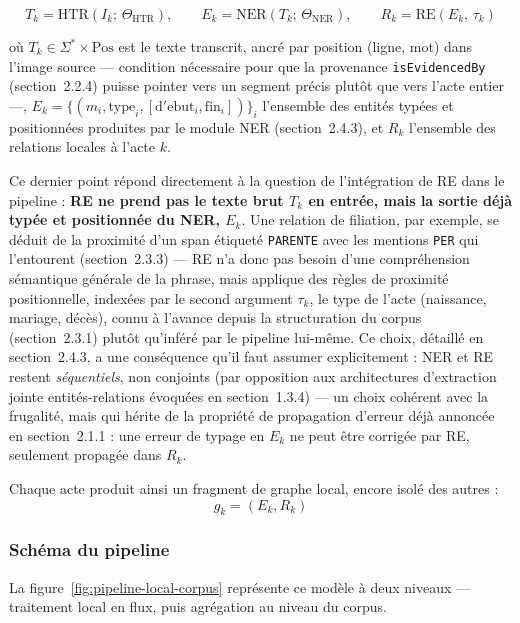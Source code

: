 \begin{equation}
    T_k = \mathrm{HTR}(I_k;\, \Theta_{\mathrm{HTR}}), \qquad
    E_k = \mathrm{NER}(T_k;\, \Theta_{\mathrm{NER}}), \qquad
    R_k = \mathrm{RE}(E_k,\, \tau_k)
\end{equation}

où $T_k \in \Sigma^{*} \times \mathrm{Pos}$ est le texte transcrit, ancré par position (ligne, mot) dans l'image source --- condition nécessaire pour que la provenance \texttt{isEvidencedBy} (section~2.2.4) puisse pointer vers un segment précis plutôt que vers l'acte entier ---, $E_k = \{(m_i, \mathrm{type}_i, [\mathrm{d'ebut}_i,\mathrm{fin}_i])\}_i$ l'ensemble des entités typées et positionnées produites par le module NER (section~2.4.3), et $R_k$ l'ensemble des relations locales à l'acte $k$.

Ce dernier point répond directement à la question de l'intégration de RE dans le pipeline : \textbf{RE ne prend pas le texte brut $T_k$ en entrée, mais la sortie déjà typée et positionnée du NER, $E_k$}.
Une relation de filiation, par exemple, se déduit de la proximité d'un span étiqueté \texttt{PARENTE} avec les mentions \texttt{PER} qui l'entourent (section~2.3.3) --- RE n'a donc pas besoin d'une compréhension sémantique générale de la phrase, mais applique des règles de proximité positionnelle, indexées par le second argument $\tau_k$, le type de l'acte (naissance, mariage, décès), connu à l'avance depuis la structuration du corpus (section~2.3.1) plutôt qu'inféré par le pipeline lui-même.
Ce choix, détaillé en section~2.4.3, a une conséquence qu'il faut assumer explicitement : NER et RE restent \emph{séquentiels}, non conjoints (par opposition aux architectures d'extraction jointe entités-relations évoquées en section~1.3.4) --- un choix cohérent avec la frugalité, mais qui hérite de la propriété de propagation d'erreur déjà annoncée en section~2.1.1 : une erreur de typage en $E_k$ ne peut être corrigée par RE, seulement propagée dans $R_k$.

Chaque acte produit ainsi un fragment de graphe local, encore isolé des autres :
\begin{equation}
    g_k = (E_k, R_k)
\end{equation}


\subsubsection*{Schéma du pipeline}

La figure~\ref{fig:pipeline-local-corpus} représente ce modèle à deux niveaux --- traitement local en flux, puis agrégation au niveau du corpus.

